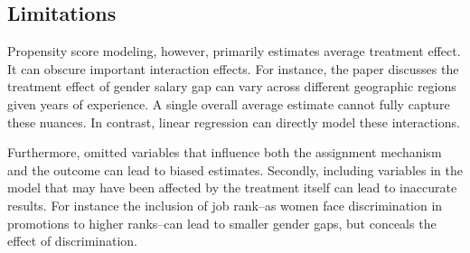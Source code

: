 \documentclass[12pt]{article}
\begin{document}
\subsection{Limitations}

Propensity score modeling, however, primarily estimates average treatment effect. It can obscure important interaction effects. For instance, the paper discusses the treatment effect of gender salary gap can vary across different geographic regions given years of experience. A single overall average estimate cannot fully capture these nuances. In contrast, linear regression can directly model these interactions.

Furthermore, omitted variables that influence both the assignment mechanism and the outcome can lead to biased estimates. Secondly, including variables in the model that may have been affected by the treatment itself can lead to inaccurate results. For instance the inclusion of job rank--as women face discrimination in promotions to higher ranks--can lead to smaller gender gaps, but conceals the effect of discrimination.
\end{document}
